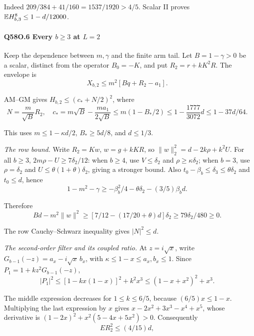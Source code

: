 Indeed \(209/384+41/160=\allowbreak 1537/1920>\allowbreak 4/5\).
Scalar II proves \(\mathbb E H_{b,\allowbreak 3}^8\le\allowbreak 1-d/12000\).

\paragraph{Q58O.6 Every $b\ge\allowbreak 3$ at $L=\allowbreak 2$}
Keep the dependence between \(m,\allowbreak \gamma\) and the finite arm tail.
Let \(B=\allowbreak 1-\gamma>\allowbreak 0\) be a scalar, distinct from the operator \(B_0=\allowbreak -K\), and put \(R_2=\allowbreak r+kK^2R\).
The envelope is
\[
X_{b,2}\le m^2[Bq+R_2-a_1].
\]

AM--GM gives \(H_{b,\allowbreak 2}\le\allowbreak (c_*+N/2)^2\), where
\[
N=\frac m{\sqrt B}R_2,\quad
c_*=m\sqrt B-\frac{ma_1}{2\sqrt B}
\le m(1-B_*/2)\le1-\frac{1777}{3072}d\le1-37d/64.
\tag{Q58O.6.1}\label{eq:Q58O:6.1}
\]

This uses \(m\le\allowbreak 1-\kappa d/2\), \(B_*\ge\allowbreak 5d/8\), and \(d\le\allowbreak 1/3\).

\emph{The row bound.}
Write \(R_2=\allowbreak Kw\), \(w=\allowbreak g+kKR\), so
\(\|w\|_2^2=\allowbreak d-2k\rho+k^2U\).
For all \(b\ge\allowbreak 3\),
\(2m\rho-U\ge\allowbreak 7\delta_2/12\):
when \(b\ge\allowbreak 4\), use \(V\le\allowbreak \delta_2\) and \(\rho\ge\allowbreak \kappa\delta_2\);
when \(b=\allowbreak 3\), use \(\rho=\allowbreak \delta_2\) and
\(U\le\allowbreak \theta(1+\theta)\delta_2\), giving a stronger bound.
Also \(t_0-\beta_b\le\allowbreak \delta_3\le\allowbreak \theta\delta_2\) and \(t_0\le\allowbreak  d\), hence
\[
1-m^2-\gamma\ge-\beta_b^2/4-\theta \delta_2-(3/5)\beta_b d.
\]

Therefore
\[
Bd-m^2\|w\|^2\ge[7/12-(17/20+\theta)d]\delta_2
\ge79\delta_2/480\ge0.
\tag{Q58O.6.2}\label{eq:Q58O:6.2}
\]

The row Cauchy--Schwarz inequality gives \(|N|^2\le\allowbreak  d\).

\emph{The second-order filter and its coupled ratio.}
At \(z=\allowbreak i\sqrt x\), write
\(G_{b-1}(-z)=\allowbreak a_x-i\sqrt x\,\allowbreak b_x\), with
\(\kappa\le\allowbreak 1-x\le\allowbreak  a_x,\allowbreak b_x\le\allowbreak 1\).
Since \(P_1=\allowbreak 1+kz^2G_{b-1}(-z)\),
\[
|P_1|^2\le[1-kx(1-x)]^2+k^2x^3
\le(1-x+x^2)^2+x^3.
\]

The middle expression decreases for \(1\le\allowbreak  k\le\allowbreak 6/5\), because
\((6/5)x\le\allowbreak 1-x\).
Multiplying the last expression by \(x\) gives
\(x-2x^2+3x^3-x^4+x^5\), whose derivative is
\((1-2x)^2+x^2(5-4x+5x^2)>\allowbreak 0\).
Consequently
\[
ER_2^2\le(4/15)d,
\tag{Q58O.6.3}\label{eq:Q58O:6.3}
\]

